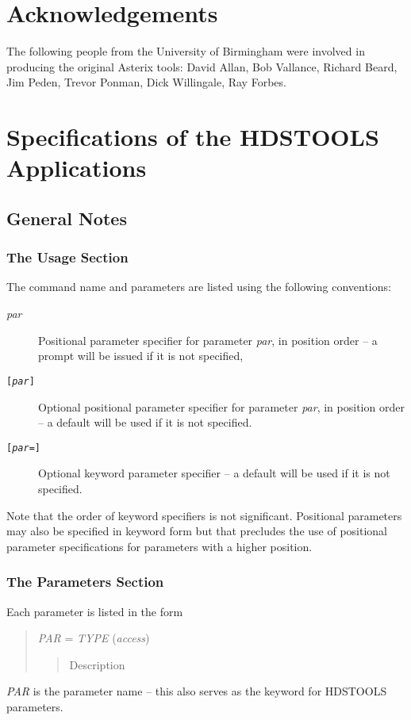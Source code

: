 \documentclass[twoside,11pt]{article}
\renewcommand{\_}{\texttt{\symbol{95}}}
\begin{document}
\section{Acknowledgements}
The following people from the University of Birmingham were involved in
producing the original Asterix tools: David Allan, Bob Vallance, Richard Beard,
Jim Peden, Trevor Ponman, Dick Willingale, Ray Forbes.

\section{Specifications of the HDSTOOLS Applications}
\subsection{General Notes}
\subsubsection{The Usage Section}
The command name and parameters are listed using the following conventions:
\begin{description}
\item[\textit{par}] Positional parameter specifier for parameter \textit{par}, 
in position order -- a prompt will be issued if it is not specified,
\item[\texttt{[\textit{par}]}] Optional positional parameter specifier for
parameter \textit{par}, in position order -- a default will be used if it is
not specified.
\item[\texttt{[\textit{par=}]}] Optional keyword parameter specifier -- a
default will be used if it is not specified.
\end{description}
Note that the order of keyword specifiers is not significant. Positional
parameters may also be specified in keyword form but that precludes the use of
positional parameter specifications for parameters with a higher position.

\subsubsection{The Parameters Section}
Each parameter is listed in the form
\begin{quote}
\textit{PAR} = \textit{TYPE} (\textit{access})
\begin{quote}
Description
\end{quote}
\end{quote}
\textit{PAR} is the parameter name -- this also serves as the keyword for
HDSTOOLS parameters.
\end{document}
